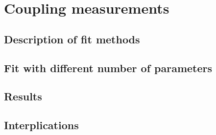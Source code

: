 \section{Coupling measurements}
\label{sec:coupling}

\subsection{Description of fit methods}

\clearpage

\subsection{Fit with different number of parameters}

\clearpage

\subsection{Results}

\clearpage

\subsection{Interplications}

\clearpage


